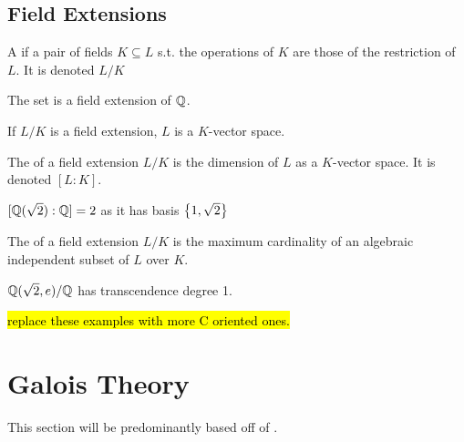 \documentclass{article}
\begin{document}
\subsection{Field Extensions}
\begin{definition}
	A  if a pair of fields $K \subseteq L$ s.t. the operations of $K$ are those of the restriction of $L$. It is denoted $L / K$
\end{definition}

\begin{example}
	The set 
	is a field extension of $\mathbb{Q}$. 
\end{example}

\begin{prop}
	If $L/K$ is a field extension, $L$ is a $K$-vector space. 
\end{prop}

\begin{definition}
	The  of a field extension $L/K$ is the dimension of $L$ as a $K$-vector space. It is denoted $[L:K]$.
\end{definition}

\begin{example}
	$[\mathbb{Q}(\sqrt{2}):\mathbb{Q}] = 2$ as it has basis $\left\{ 1,\sqrt{2} \right\}$
\end{example}

\begin{definition}
	The  of a field extension $L/K$ is the maximum cardinality of an algebraic independent subset of $L$ over $K$. 
\end{definition}

\begin{example}
	$\mathbb{Q}(\sqrt{2},e)/\mathbb{Q}$ has transcendence degree 1.
\end{example}

\hl{replace these examples with more C oriented ones. }
\section{Galois Theory}
This section will be predominantly based off of \cite{Stewart2003}. 
\end{document}
